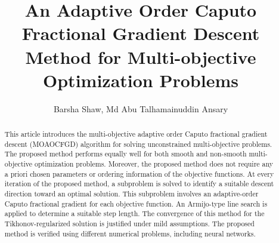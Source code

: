 \documentclass[smallextended,referee,envcountsect]{svjour3}
\begin{document}
\title{An Adaptive Order Caputo Fractional Gradient Descent Method for Multi-objective Optimization Problems}


\author{Barsha Shaw, Md Abu Talhamainuddin Ansary}




\maketitle
\begin{abstract}
This article introduces the multi-objective adaptive order Caputo fractional gradient descent (MOAOCFGD) algorithm for solving unconstrained multi-objective problems. The proposed method performs equally well for both smooth and non-smooth multi-objective optimization problems. Moreover, the proposed method does not require any a priori chosen parameters or ordering information of the objective functions. At every iteration of the proposed method, a subproblem is solved to identify a suitable descent direction toward an optimal solution. This subproblem involves an adaptive-order Caputo fractional gradient for each objective function. An Armijo-type line search is applied to determine a suitable step length. The convergence of this method for the Tikhonov-regularized solution is justified under mild assumptions. The proposed method is verified using different numerical problems, including neural networks.
\end{abstract}
\end{document}

